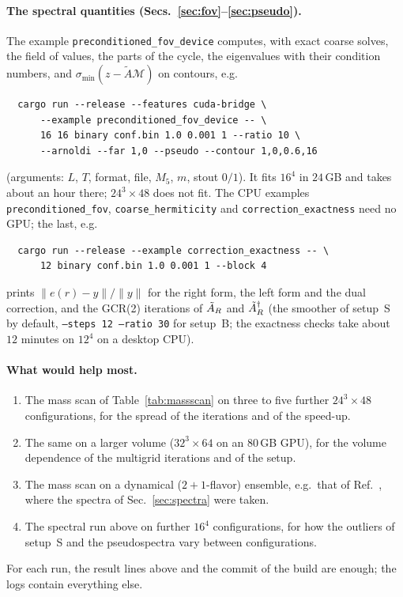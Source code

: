 \paragraph{The spectral quantities (Secs.~\ref{sec:fov}--\ref{sec:pseudo}).} The
example \texttt{preconditioned\_fov\_device} computes, with exact coarse solves, the
field of values, the parts of the cycle, the eigenvalues with their condition
numbers, and $\sigma_{\min}(z-\tilde A\mathcal M)$ on contours, e.g.
{\small
\begin{verbatim}
  cargo run --release --features cuda-bridge \
      --example preconditioned_fov_device -- \
      16 16 binary conf.bin 1.0 0.001 1 --ratio 10 \
      --arnoldi --far 1,0 --pseudo --contour 1,0,0.6,16
\end{verbatim}}
(arguments: $L$, $T$, format, file, $M_5$, $m$, stout $0/1$). It fits $16^4$ in $24$\,GB
and takes about an hour there; $24^3\times48$ does not fit. The CPU examples
\texttt{preconditioned\_fov}, \texttt{coarse\_hermiticity} and
\texttt{correction\_exactness} need no GPU; the last, e.g.
{\small
\begin{verbatim}
  cargo run --release --example correction_exactness -- \
      12 binary conf.bin 1.0 0.001 1 --block 4
\end{verbatim}}
\noindent prints $\|e(r)-y\|/\|y\|$ for the right form, the left form and the dual
correction, and the GCR(2) iterations of $\tilde A_{R}$ and $\tilde A_{R}^{\dagger}$ (the smoother of setup~S
by default, \texttt{--steps 12 --ratio 30} for setup~B; the exactness checks take about
$12$ minutes on $12^4$ on a desktop CPU).

\paragraph{What would help most.}
\begin{enumerate}
\item The mass scan of Table~\ref{tab:massscan} on three to five further
$24^3\times48$ configurations, for the spread of the iterations and of the
speed-up.
\item The same on a larger volume ($32^3\times64$ on an $80$\,GB GPU), for the volume
dependence of the multigrid iterations and of the setup.
\item The mass scan on a dynamical ($2+1$-flavor) ensemble, e.g.\ that of
Ref.~\cite{KCM2024}, where the spectra of Sec.~\ref{sec:spectra} were taken.
\item The spectral run above on further $16^4$ configurations, for how the outliers
of setup~S and the pseudospectra vary between configurations.
\end{enumerate}
For each run, the result lines above and the commit of the build are enough; the
logs contain everything else.
\endgroup
